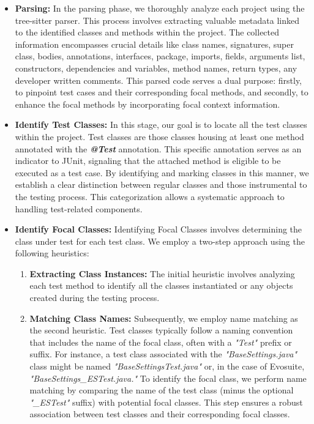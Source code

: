 \begin{itemize}
  \item \textbf{Parsing:} In the parsing phase, we thoroughly analyze each project using the tree-sitter parser\cite{noauthor_tree-sitterintroduction_nodate}. This process involves extracting valuable metadata linked to the identified classes and methods within the project. The collected information encompasses crucial details like class names, signatures, super class, bodies, annotations, interfaces, package, imports, fields, arguments list, constructors, dependencies and variables, method names, return types, any developer written comments. This parsed code serves a dual purpose: firstly, to pinpoint test cases and their corresponding focal methods, and secondly, to enhance the focal methods by incorporating focal context information.
                                
  \item \textbf{Identify Test Classes:} In this stage, our goal is to locate all the test classes within the project. Test classes are those classes housing at least one method annotated with the \textit{\textbf{@Test}} annotation. This specific annotation serves as an indicator to JUnit, signaling that the attached method is eligible to be executed as a test case. By identifying and marking classes in this manner, we establish a clear distinction between regular classes and those instrumental to the testing process. This categorization allows a systematic approach to handling test-related components.

  \item \textbf{Identify Focal Classes:} Identifying Focal Classes involves determining the class under test for each test class. We employ a two-step approach using the following heuristics:
        \begin{enumerate}
            \item \textbf{Extracting Class Instances:} The initial heuristic involves analyzing each test method to identify all the classes instantiated or any objects created during the testing process.
            \item \textbf{Matching Class Names:} Subsequently, we employ name matching as the second heuristic. Test classes typically follow a naming convention that includes the name of the focal class, often with a \textit{"Test"} prefix or suffix. For instance, a test class associated with the \textit{"BaseSettings.java"} class might be named \textit{"BaseSettingsTest.java"} or, in the case of Evosuite, \textit{"BaseSettings\_ESTest.java."} To identify the focal class, we perform name matching by comparing the name of the test class (minus the optional \textit{"\_ESTest"} suffix) with potential focal classes. This step ensures a robust association between test classes and their corresponding focal classes.
        \end{enumerate}


\end{itemize}
